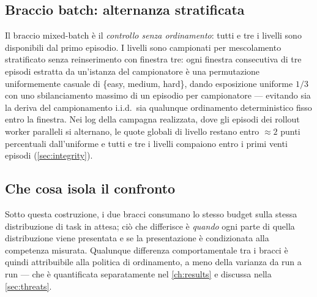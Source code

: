 \subsection{Braccio batch: alternanza stratificata}
\label{sec:batch-arm}

Il braccio mixed-batch è il \emph{controllo senza ordinamento}: tutti e
tre i livelli sono disponibili dal primo episodio. I livelli sono
campionati per mescolamento stratificato senza reinserimento con
finestra tre: ogni finestra consecutiva di tre episodi estratta da
un'istanza del campionatore è una permutazione uniformemente casuale di
\{easy, medium, hard\}, dando esposizione uniforme $1/3$ con uno
sbilanciamento massimo di un episodio per campionatore --- evitando sia
la deriva del campionamento i.i.d.\ sia qualunque ordinamento
deterministico fisso entro la finestra. Nei log della campagna
realizzata, dove gli episodi dei rollout worker paralleli si alternano,
le quote globali di livello restano entro $\approx 2$ punti percentuali
dall'uniforme e tutti e tre i livelli compaiono entro i primi venti
episodi (\cref{sec:integrity}).

\subsection{Che cosa isola il confronto}
\label{sec:isolation}

Sotto questa costruzione, i due bracci consumano lo stesso budget sulla
stessa distribuzione di task in attesa; ciò che differisce è
\emph{quando} ogni parte di quella distribuzione viene presentata e se
la presentazione è condizionata alla competenza misurata. Qualunque
differenza comportamentale tra i bracci è quindi attribuibile alla
politica di ordinamento, a meno della varianza da run a run --- che è
quantificata separatamente nel \cref{ch:results} e discussa nella
\cref{sec:threats}.

